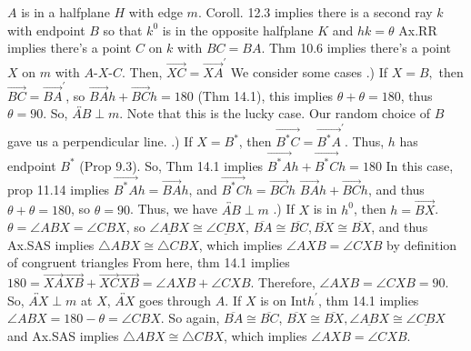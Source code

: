 \documentclass{report}
\begin{document}
\begin{itemize}
            \bigbreak \noindent 
            \bigbreak \noindent 
            $A$ is in a halfplane $H$ with edge $m$. Coroll. 12.3 implies there is a second ray $k$ with endpoint $B$ so that $k^{0}$ is in the opposite halfplane $K$ and $hk= \theta$
            \bigbreak \noindent 
            \bigbreak \noindent 
            Ax.RR implies there's a point $C$ on $k$ with $BC = BA$. Thm 10.6 implies there's a point $X$ on $m$ with $ A\text{-}X\text{-}C$. Then, $ \overrightarrow{XC} =  \overrightarrow{XA}^{\prime}$
            \bigbreak \noindent 
            We consider some cases
            \bigbreak {}.) If $X = B,$ then $\overrightarrow{BC} = \overrightarrow{BA}^{\prime}$, so $ \overrightarrow{BA}h + \overrightarrow{BC}h = 180$ (Thm 14.1), this implies $ \theta  + \theta  = 180$, thus $\theta  = 90$. So, $\overleftrightarrow{AB} \perp m$. Note that this is the lucky case. Our random choice of $B$ gave us a perpendicular line.
            \bigbreak {}.) If $X = B^{*}$, then $\overrightarrow{B^{*}C} = \overrightarrow{B^{*}A}^{\prime}$. Thus, $h$ has endpoint $B^{*}$ (Prop 9.3). So, Thm 14.1 implies $ \overrightarrow{B^{*}A}h + \overrightarrow{B^{*}C}h = 180$
            \bigbreak \noindent 
            In this case, prop 11.14 implies $\overrightarrow{B^{*}A}h = \overrightarrow{BA}h$, and $\overrightarrow{B^{*}C}h = \overrightarrow{BC}h$ $\overrightarrow{BA}h  + \overrightarrow{BC}h$, and thus $\theta  + \theta  = 180$, so $\theta  = 90$. Thus, we have $\overleftrightarrow{AB} \perp m$
            \bigbreak {}.) If $X$ is in $h^{0}$, then $ h = \overrightarrow{BX}$.
            \bigbreak \noindent 
            \bigbreak \noindent 
            $\theta  = \angle ABX = \angle CBX$, so $\underline{\angle ABX} \cong \underline{\angle CBX} $, $ \overline{BA} \cong \overline{BC}, \overline{BX} \cong \overline{BX}$, and thus Ax.SAS implies $\triangle ABX \cong \triangle CBX $, which implies $\angle AXB = \angle CXB$ by definition of congruent triangles
            \bigbreak \noindent 
            From here, thm 14.1 implies $180 = \overrightarrow{XA}\overrightarrow{XB} + \overrightarrow{XC}\overrightarrow{XB} = \angle AXB + \angle CXB$. 
            \bigbreak \noindent 
            Therefore, $\angle AXB = \angle CXB = 90$. So, $\overleftrightarrow{AX} \perp m$ at $X$, $\overleftrightarrow{AX}$ goes through $A$.
            \bigbreak \noindent 
            If $X$ is on $\text{Int}h^{\prime}$, thm 14.1 implies $\angle ABX = 180 - \theta = \angle CBX$. So again, $\overline{BA} \cong \overline{BC}$, $ \overline{BX} \cong \overline{BX}, \underline{\angle ABX} \cong \underline{\angle CBX}$ and Ax.SAS implies $ \triangle ABX  \cong \triangle CBX$, which implies $\angle AXB = \angle CXB$.

\end{itemize}
\end{document}
